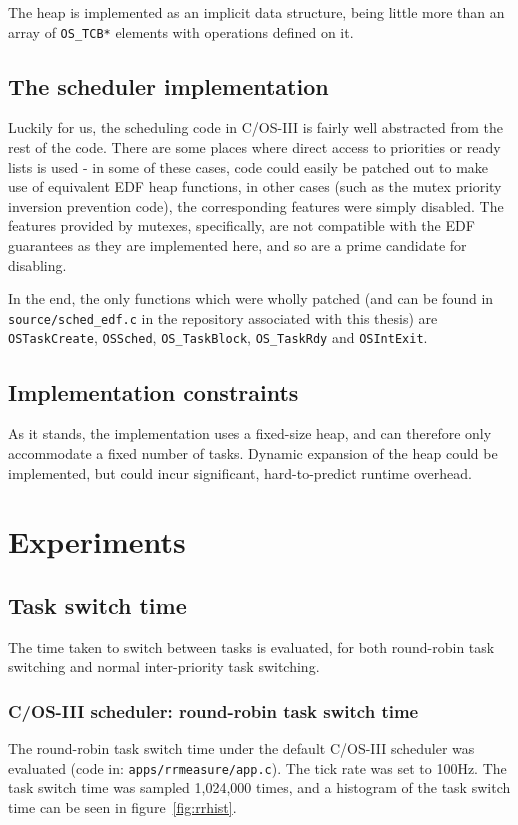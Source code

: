 \documentclass[twoside]{uva-inf-bachelor-thesis}
\newcommand{\code}[1]{\lstinline[breaklines=true]{#1}}
\newcommand{\ucosiii}{\textmu C/OS-III\xspace}
\begin{document}
The heap is implemented as an implicit data structure, being little more than an array of \code{OS_TCB*} elements with operations defined on it.

\section{The scheduler implementation}
Luckily for us, the scheduling code in \ucosiii is fairly well abstracted from the rest of the code. There are some places where direct access to priorities or ready lists is used - in some of these cases, code could easily be patched out to make use of equivalent EDF heap functions, in other cases (such as the mutex priority inversion prevention code), the corresponding features were simply disabled. The features provided by mutexes, specifically, are not compatible with the EDF guarantees as they are implemented here, and so are a prime candidate for disabling.

In the end, the only functions which were wholly patched (and can be found in \code{source/sched_edf.c} in the repository associated with this thesis) are \code{OSTaskCreate}, \code{OSSched}, \code{OS_TaskBlock}, \code{OS_TaskRdy} and \code{OSIntExit}.

\section{Implementation constraints}
As it stands, the implementation uses a fixed-size heap, and can therefore only accommodate a fixed number of tasks. Dynamic expansion of the heap could be implemented, but could incur significant, hard-to-predict runtime overhead.

%
%
%
%

\chapter{Experiments}
\section{Task switch time}
The time taken to switch between tasks is evaluated, for both round-robin task switching and normal inter-priority task switching.

\subsection{\ucosiii scheduler: round-robin task switch time}
The round-robin task switch time under the default \ucosiii scheduler was evaluated (code in: \code{apps/rrmeasure/app.c}). The tick rate was set to 100Hz. The task switch time was sampled 1,024,000 times, and a histogram of the task switch time can be seen in figure~\ref{fig:rrhist}. 
\end{document}
